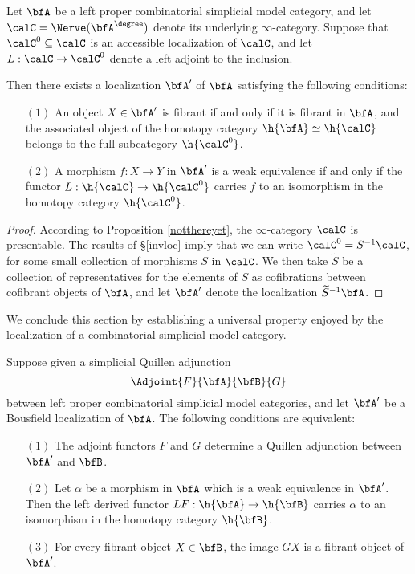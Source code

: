 \begin{Simplicial Categories}
\begin{proposition}\label{cabber}
Let $\bfA$ be a left proper combinatorial simplicial model category, and let
$\calC = \Nerve( \bfA^{\degree} )$ denote its underlying $\infty$-category.
Suppose that $\calC^{0} \subseteq \calC$ is an accessible localization of $\calC$, and let
$L: \calC \rightarrow \calC^{0}$ denote a left adjoint to the inclusion.

Then there exists a localization $\bfA'$ of $\bfA$ satisfying the following conditions:
\begin{itemize}
\item[$(1)$] An object $X \in \bfA'$ is fibrant if and only if it is fibrant in $\bfA$, and
the associated object of the homotopy category $\h{ \bfA} \simeq \h{ \calC}$ belongs to the full subcategory $\h{ \calC^{0}}$. 
\item[$(2)$] A morphism $f: X \rightarrow Y$ in $\bfA'$ is a weak equivalence if and only if
the functor $L: \h{ \calC} \rightarrow \h{ \calC^{0} }$ carries $f$ to an isomorphism in the homotopy category $\h{ \calC^{0} }$.
\end{itemize}
\end{proposition}

\begin{proof}
According to Proposition \ref{notthereyet}, the $\infty$-category $\calC$ is presentable. 
The results of \S \ref{invloc} imply that we can write $\calC^{0} = S^{-1} \calC$, for some
small collection of morphisms $S$ in $\calC$. We then take $\widetilde{S}$ be a collection of representatives for the elements of $S$ as cofibrations between cofibrant objects of $\bfA$, and let
$\bfA'$ denote the localization $\widetilde{S}^{-1} \bfA$. 
\end{proof}

We conclude this section by establishing a universal property enjoyed by the localization of a combinatorial simplicial model category.

\begin{proposition}\label{stake}
Suppose given a simplicial Quillen adjunction
$$ \Adjoint{F}{\bfA}{\bfB}{G}$$
between left proper combinatorial simplicial model categories, and let $\bfA'$ be a Bousfield localization of $\bfA$. The following conditions are equivalent:
\begin{itemize}
\item[$(1)$] The adjoint functors $F$ and $G$ determine a Quillen adjunction between
$\bfA'$ and $\bfB$.
\item[$(2)$] Let $\alpha$ be a morphism in $\bfA$ which is a weak equivalence in
$\bfA'$. Then the left derived functor $LF: \h{\bfA} \rightarrow \h{\bfB}$ carries
$\alpha$ to an isomorphism in the homotopy category $\h{\bfB}$.
\item[$(3)$] For every fibrant object $X \in \bfB$, the image $GX$ is a fibrant object of $\bfA'$.
\end{itemize}
\end{proposition}


\end{Simplicial Categories}
